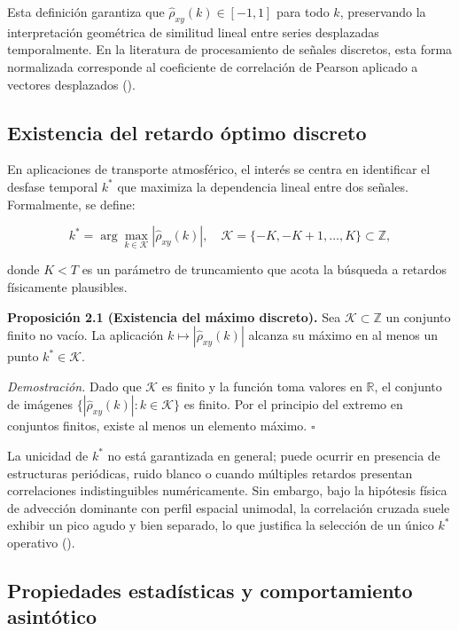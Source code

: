 \documentclass[
  spanish,
  us-letterpaper,
]{scrreprt}
\numberwithin{equation}{section}
\begin{document}
Esta definición garantiza que \(\hat{\rho}_{xy}(k) \in [-1, 1]\) para
todo \(k\), preservando la interpretación geométrica de similitud lineal
entre series desplazadas temporalmente. En la literatura de
procesamiento de señales discretos, esta forma normalizada corresponde
al coeficiente de correlación de Pearson aplicado a vectores desplazados
().

\subsection{Existencia del retardo óptimo
discreto}\label{existencia-del-retardo-uxf3ptimo-discreto}

En aplicaciones de transporte atmosférico, el interés se centra en
identificar el desfase temporal \(k^*\) que maximiza la dependencia
lineal entre dos señales. Formalmente, se define:

\[
k^* = \arg\max_{k \in \mathcal{K}} \left| \hat{\rho}_{xy}(k) \right|, \quad \mathcal{K} = \{-K, -K+1, \dots, K\} \subset \mathbb{Z},
\]

donde \(K < T\) es un parámetro de truncamiento que acota la búsqueda a
retardos físicamente plausibles.

\textbf{Proposición 2.1 (Existencia del máximo discreto).} Sea
\(\mathcal{K} \subset \mathbb{Z}\) un conjunto finito no vacío. La
aplicación \(k \mapsto |\hat{\rho}_{xy}(k)|\) alcanza su máximo en al
menos un punto \(k^* \in \mathcal{K}\).

\emph{Demostración.} Dado que \(\mathcal{K}\) es finito y la función
toma valores en \(\mathbb{R}\), el conjunto de imágenes
\(\{|\hat{\rho}_{xy}(k)| : k \in \mathcal{K}\}\) es finito. Por el
principio del extremo en conjuntos finitos, existe al menos un elemento
máximo. \(\square\)

La unicidad de \(k^*\) no está garantizada en general; puede ocurrir en
presencia de estructuras periódicas, ruido blanco o cuando múltiples
retardos presentan correlaciones indistinguibles numéricamente. Sin
embargo, bajo la hipótesis física de advección dominante con perfil
espacial unimodal, la correlación cruzada suele exhibir un pico agudo y
bien separado, lo que justifica la selección de un único \(k^*\)
operativo ().

\subsection{Propiedades estadísticas y comportamiento
asintótico}\label{propiedades-estaduxedsticas-y-comportamiento-asintuxf3tico}
\end{document}

